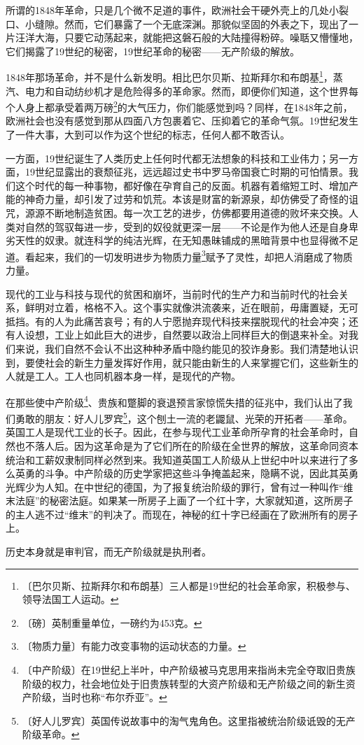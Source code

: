 \documentclass[12pt,UTF-8,openany]{ctexbook}
\begin{document}
\begin{normalsize}
    
    所谓的1848年革命，只是几个微不足道的事件，欧洲社会干硬外壳上的几处小裂口、小缝隙。然而，它们暴露了一个无底深渊。那貌似坚固的外表之下，现出了一片汪洋大海，只要它动荡起来，就能把这磐石般的大陆撞得粉碎。噪聒又懵懂地，它们揭露了19世纪的秘密，19世纪革命的秘密——无产阶级的解放。
    
    1848年那场革命，并不是什么新发明。相比巴尔贝斯、拉斯拜尔和布朗基\footnote{〔巴尔贝斯、拉斯拜尔和布朗基〕三人都是19世纪的社会革命家，积极参与、领导法国工人运动。}，蒸汽、电力和自动纺纱机才是危险得多的革命家。然而，即便你们知道，这个世界每个人身上都承受着两万磅\footnote{〔磅〕英制重量单位，一磅约为453克。}的大气压力，你们能感觉到吗？同样，在1848年之前，欧洲社会也没有感觉到那从四面八方包裹着它、压抑着它的革命气氛。19世纪发生了一件大事，大到可以作为这个世纪的标志，任何人都不敢否认。
    
    一方面，19世纪诞生了人类历史上任何时代都无法想象的科技和工业伟力；另一方面，19世纪显露出的衰颓征兆，远远超过史书中罗马帝国衰亡时期的可怕情景。我们这个时代的每一种事物，都好像在孕育自己的反面。机器有着缩短工时、增加产能的神奇力量，却引发了过劳和饥荒。本该是财富的新源泉，却仿佛受了奇怪的诅咒，源源不断地制造贫困。每一次工艺的进步，仿佛都要用道德的败坏来交换。人类对自然的驾驭每进一步，受到的奴役就更深一层——不论是作为他人还是自身卑劣天性的奴隶。就连科学的纯洁光辉，在无知愚昧铺成的黑暗背景中也显得微不足道。看起来，我们的一切发明进步为物质力量\footnote{〔物质力量〕有能力改变事物的运动状态的力量。}赋予了灵性，却把人消磨成了物质力量。
    
    现代的工业与科技与现代的贫困和崩坏，当前时代的生产力和当前时代的社会关系，鲜明对立着，格格不入。这个事实就像洪流袭来，近在眼前，毋庸置疑，无可抵挡。有的人为此痛苦哀号；有的人宁愿抛弃现代科技来摆脱现代的社会冲突；还有人设想，工业上如此巨大的进步，自然要以政治上同样巨大的倒退来补全。对我们来说，我们自然不会认不出这种种矛盾中隐约能见的狡诈身影。我们清楚地认识到，要使社会的新生力量发挥好作用，就只能由新生的人来掌握它们，这些新生的人就是工人。工人也同机器本身一样，是现代的产物。
    
    在那些使中产阶级\footnote{〔中产阶级〕在19世纪上半叶，中产阶级被马克思用来指尚未完全夺取旧贵族阶级的权力，社会地位处于旧贵族转型的大资产阶级和无产阶级之间的新生资产阶级，当时也称“布尔乔亚”。}、贵族和蹩脚的衰退预言家惊慌失措的征兆中，我们认出了我们勇敢的朋友：好人儿罗宾\footnote{〔好人儿罗宾〕英国传说故事中的淘气鬼角色。这里指被统治阶级诋毁的无产阶级革命。}，这个刨土一流的老鼹鼠、光荣的开拓者——革命。英国工人是现代工业的长子。因此，在参与现代工业革命所孕育的社会革命时，自然也不落人后。因为这革命是为了它们所在的阶级在全世界的解放，这革命同资本统治和工薪奴隶制同样必然到来。我知道英国工人阶级从上世纪中叶以来进行了多么英勇的斗争。中产阶级的历史学家把这些斗争掩盖起来，隐瞒不说，因此其英勇光辉少为人知。在中世纪的德国，为了报复统治阶级的罪行，曾有过一种叫作“维末法庭”的秘密法庭。如果某一所房子上画了一个红十字，大家就知道，这所房子的主人逃不过“维末”的判决了。而现在，神秘的红十字已经画在了欧洲所有的房子上。
    
    历史本身就是审判官，而无产阶级就是执刑者。
    
\end{normalsize}
\end{document}
